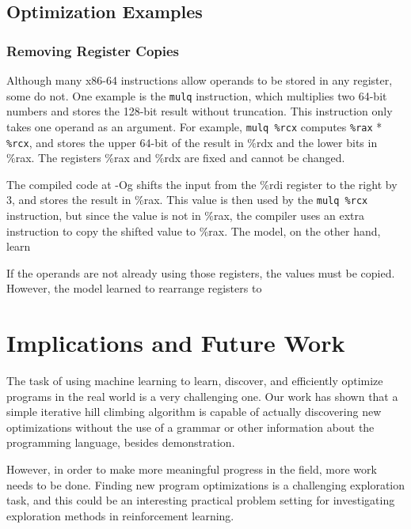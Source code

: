 \documentclass{article}
\begin{document}
\subsection{Optimization Examples}

\subsubsection{Removing Register Copies}

Although many x86-64 instructions allow operands to be stored in any register, some do not.  One example is the  \texttt{mulq} instruction, which multiplies two 64-bit numbers and stores the 128-bit result without truncation. This instruction only takes one operand as an argument.  For example, \texttt{mulq \%rcx} computes \texttt{\%rax} * \texttt{\%rcx}, and stores the upper 64-bit of the result in \%rdx and the lower bits in \%rax.  The registers \%rax and \%rdx are fixed and cannot be changed.
%

The compiled code at -Og shifts the input from the \%rdi register to the right by 3, and stores the result in \%rax.  This value is then used by the \texttt{mulq \%rcx} instruction, but since the value is not in \%rax, the compiler uses an extra instruction to copy the shifted value to \%rax.
%
The model, on the other hand, learn



If the operands are not already using those registers, the values must be copied.  However, the model learned to rearrange registers to 

\section{Implications and Future Work}


The task of using machine learning to learn, discover, and efficiently optimize programs in the real world is a very challenging one. Our work has shown that a simple iterative hill climbing algorithm is capable of actually discovering new optimizations without the use of a grammar or other information about the programming language, besides demonstration. 

However, in order to make more meaningful progress in the field, more work needs to be done. Finding new program optimizations is a challenging exploration task, and this could be an interesting practical problem setting for investigating exploration methods in reinforcement learning. 
\end{document}
